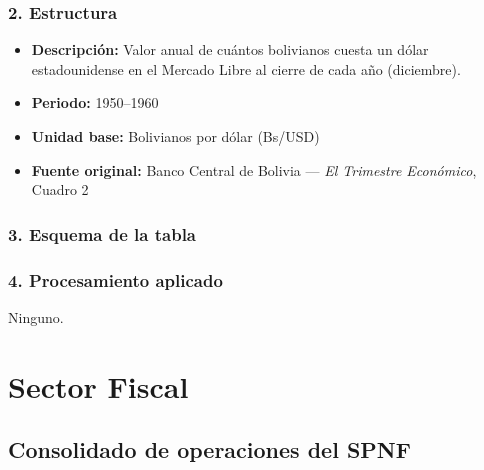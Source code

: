 \documentclass[12pt,a4paper]{article}
\begin{document}
\subsubsection*{2. Estructura}
\begin{itemize}
  \item \textbf{Descripción:} Valor anual de cuántos bolivianos cuesta un dólar estadounidense en el Mercado Libre al cierre de cada año (diciembre).
  \item \textbf{Periodo:} 1950--1960
  \item \textbf{Unidad base:} Bolivianos por dólar (Bs/USD)
  \item \textbf{Fuente original:} Banco Central de Bolivia — \emph{El Trimestre Económico}, Cuadro 2
\end{itemize}

\subsubsection*{3. Esquema de la tabla}

\subsubsection*{4. Procesamiento aplicado}
Ninguno.







\section{Sector Fiscal}

\subsection{Consolidado de operaciones del SPNF}
\end{document}

